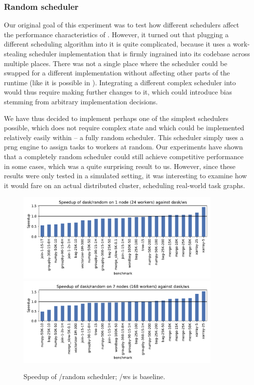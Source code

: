 \subsubsection*{Random scheduler}
Our original goal of this experiment was to test how different schedulers affect the performance
characteristics of \dask{}. However, it turned out that plugging a different
scheduling algorithm into it is quite complicated, because it uses a work-stealing scheduler
implementation that is firmly ingrained into its codebase across multiple places. There was not a
single place where the scheduler could be swapped for a different implementation without affecting
other parts of the runtime (like it is possible in \estee{}). Integrating a
different complex scheduler into \dask{} would thus require making further
changes to it, which could introduce bias stemming from arbitrary implementation decisions.

We have thus decided to implement perhaps one of the simplest schedulers possible, which does not
require complex state and which could be implemented relatively easily within
\dask{} -- a fully random scheduler. This scheduler simply uses a
\gls{prng} engine to assign tasks to workers at random. Our
\estee{} experiments have shown that a completely random scheduler could still
achieve competitive performance in some cases, which was a quite surprising result to us. However,
since these results were only tested in a simulated setting, it was interesting to examine how it
would fare on an actual distributed cluster, scheduling real-world \dask{} task
graphs.

\begin{figure}
	\centering
	\includegraphics[width=0.9\textwidth]{imgs/rsds/charts/speedup-dask-random-1}
	\includegraphics[width=0.9\textwidth]{imgs/rsds/charts/speedup-dask-random-7}
	\caption{Speedup of \dask{}/random scheduler; \dask{}/ws is baseline.}
	\label{fig:dask-ws-vs-random}
\end{figure}

